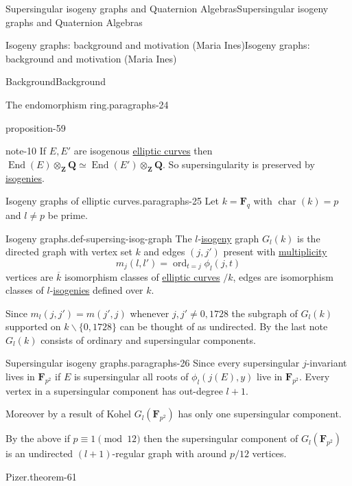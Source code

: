 \documentclass[10pt,]{book}
\numberwithin{equation}{section}
\newcommand{\ZZ}{\mathbf{Z}}
\newcommand{\QQ}{\mathbf{Q}}
\newcommand{\FF}{\mathbf{F}}
\DeclareMathOperator{\End}{End}
\DeclareMathOperator{\characteristic}{char}
\DeclareMathOperator{\ord}{ord}
\begin{document}
\begin{chapterptx}{Supersingular isogeny graphs and Quaternion Algebras}{}{Supersingular isogeny graphs and Quaternion Algebras}{}{}
\begin{sectionptx}{Isogeny graphs: background and motivation (Maria Ines)}{}{Isogeny graphs: background and motivation (Maria Ines)}{}{}
\begin{subsectionptx}{Background}{}{Background}{}{}
\begin{paragraphs}{The endomorphism ring.}{paragraphs-24}
\begin{proposition}{}{}{proposition-59}
\begin{enumerate}
\end{enumerate}
%
\end{proposition}
\begin{note}{}{note-10}%
\hypertarget{p-800}{}%
If \(E,E'\) are isogenous \hyperref[def-supersing-isog-ec]{elliptic curves} then \(\End(E) \otimes_\ZZ \QQ \simeq \End(E')\otimes_\ZZ \QQ\). So supersingularity is preserved by \hyperref[def-supersing-isog-isog]{isogenies}.%
\end{note}
\end{paragraphs}%
\begin{paragraphs}{Isogeny graphs of elliptic curves.}{paragraphs-25}%
\hypertarget{p-801}{}%
Let \(k = \FF_q\) with \(\characteristic(k) = p\) and \(l \ne p \) be prime.%
\begin{definition}{Isogeny graphs.}{def-supersing-isog-graph}%
\hypertarget{p-802}{}%
The \(l\)-\hyperref[def-supersing-isog-isog]{isogeny} graph \(G_l(k)\) is the directed graph with vertex set \(k\) and edges \((j,j')\) present with \hyperref[def-riem-order-vanish]{multiplicity}%
\begin{equation*}
m_j(l,l') = \ord_{t=j} \phi_l(j,t)
\end{equation*}
vertices are \(\overline k\) isomorphism classes of  \hyperref[def-supersing-isog-ec]{elliptic curves} \(/k\), edges are isomorphism classes of \(l\)-\hyperref[def-supersing-isog-isog]{isogenies} defined over \(k\).%
\end{definition}
\hypertarget{p-803}{}%
Since \(m_l(j,j') =  m(j',j)\) whenever \(j,j' \ne  0,1728\) the subgraph of \(G_l(k)\) supported on \(k\smallsetminus \{0,1728\}\) can be thought of as undirected. By the last note \(G_l(k)\) consists of ordinary and supersingular components.%
\end{paragraphs}%
\begin{paragraphs}{Supersingular isogeny graphs.}{paragraphs-26}%
\hypertarget{p-804}{}%
Since every supersingular \(j\)-invariant lives in \(\FF_{p^2}\) if \(E\) is supersingular all roots of \(\phi_l(j(E), y)\) live in \(\FF_{p^2}\). Every vertex in a supersingular component has out-degree \(l+1\).%
\par
\hypertarget{p-805}{}%
Moreover by a result of Kohel \(G_l(\FF_{p^2})\) has only one supersingular component.%
\par
\hypertarget{p-806}{}%
By the above if \(p \equiv 1 \pmod {12}\) then the supersingular component of \(G_l(\FF_{p^2})\) is an undirected \((l+1)\)-regular graph with around \(p/12\) vertices.%
\begin{theorem}{Pizer.}{}{theorem-61}%

\end{theorem}
\end{paragraphs}
\end{subsectionptx}
\end{sectionptx}
\end{chapterptx}
\end{document}
